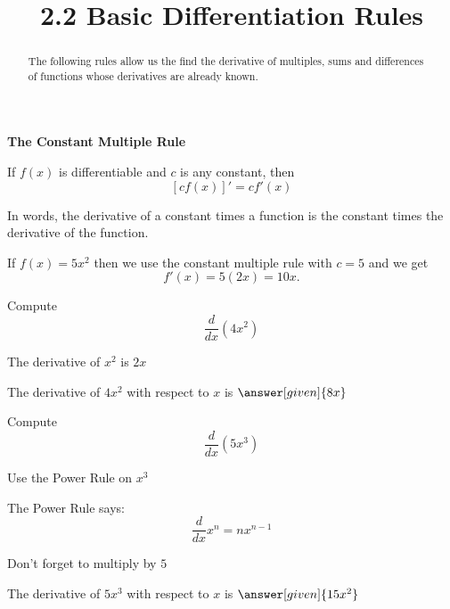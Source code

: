 \documentclass{ximera}
\title{2.2 Basic Differentiation Rules}
\begin{document}
\begin{abstract}
The following rules allow us the find the derivative of multiples, sums and differences of functions 
whose derivatives are already known.
\end{abstract}


\maketitle



\begin{center}
\bf{The Constant Multiple Rule}
\end{center}


\begin{theorem} If $f(x)$ is differentiable and $c$ is any constant, then
\[[cf(x)]' = c f'(x)\]
\end{theorem}

In words, the derivative of a constant times a function is the constant times the derivative of the function.\\



\begin{example} %
 If $f(x) = 5x^2$ then  we use the constant multiple rule with $c = 5$ and we get 
\[
f'(x) = 5(2x)  = 10x.
\]
\end{example}


\begin{problem} %
  Compute 
  \[
  \frac{d}{dx} \left(4x^2\right)
  \]
  
    \begin{hint}
      The derivative of $x^2$ is $2x$
    \end{hint}    
		The derivative of $4x^2$ with respect to $x$ is
		 $\answer[given]{8x}$
	
\end{problem}



\begin{problem} %
  Compute 
  \[
  \frac{d}{dx} \left(5x^3\right)
  \]
  
    \begin{hint}
      Use the Power Rule on $x^3$
    \end{hint}
    \begin{hint}
      The Power Rule says:
      \[
      \frac{d}{dx} x^n = nx^{n-1}
      \]
    \end{hint}
		\begin{hint}
		  Don't forget to multiply by $5$
		\end{hint}
		The derivative of $5x^3$ with respect to $x$ is
		 $\answer[given]{15x^2}$
	
\end{problem}
\end{document}
